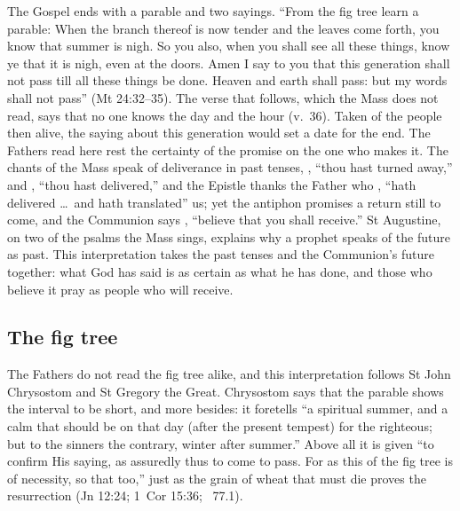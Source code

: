 
The Gospel ends with a parable and two sayings. ``From the fig tree learn a
parable: When the branch thereof is now tender and the leaves come forth, you
know that summer is nigh. So you also, when you shall see all these things,
know ye that it is nigh, even at the doors. Amen I say to you that this
generation shall not pass till all these things be done. Heaven and earth shall
pass: but my words shall not pass'' (Mt 24:32--35). The verse that follows,
which the Mass does not read, says that no one knows the day and the hour
(v.~36). Taken of the people then alive, the saying about this generation
would set a date for the end. The Fathers read here rest the certainty of the
promise on the one who makes it. The chants of the
Mass speak of deliverance in past tenses, , ``thou hast
turned away,'' and , ``thou hast delivered,'' and the Epistle
thanks the Father who , ``hath delivered
\dots\ and hath translated'' us; yet the antiphon promises a return still to
come, and the Communion says , ``believe that
you shall receive.'' St Augustine, on two of the psalms the Mass sings,
explains why a prophet speaks of the future as past. This interpretation
takes the past tenses and the Communion's future together: what God has said
is as certain as what he has done, and those who believe it pray as people
who will receive.

\subsection{The fig tree}
\label{sec:words-fig}

The Fathers do not read the fig tree alike, and this interpretation follows St
John Chrysostom and St Gregory the Great. Chrysostom says that the
parable shows the interval to be short, and more besides: it foretells ``a
spiritual summer, and a calm that should be on that day (after the present
tempest) for the righteous; but to the sinners the contrary, winter after
summer.'' Above all it is given ``to confirm His saying, as assuredly thus to
come to pass. For as this of the fig tree is of necessity, so that too,'' just
as the grain of wheat that must die proves the resurrection (Jn 12:24; 1~Cor
15:36; ~77.1).

